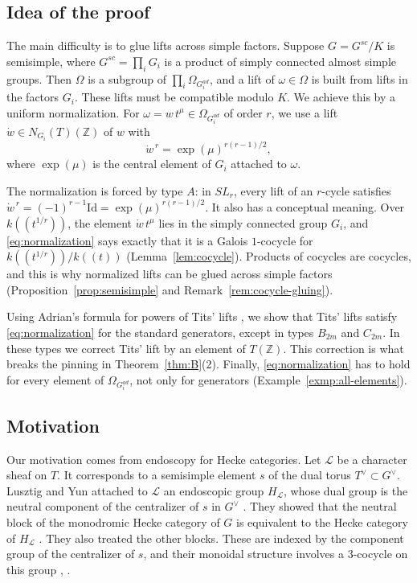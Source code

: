 \documentclass[psamsfonts]{amsart}
\theoremstyle{definition}
\theoremstyle{remark}
\numberwithin{equation}{section}
\newcommand{\Z}{\mathbb{Z}}   %
\newcommand{\wdo}{\dot{w}}
\newcommand\cL{\mathcal{L}}
\numberwithin{equation}{section}
\newcommand{\lr}[1]{(\!(#1)\!)}
\newcommand{\om}{\omega}
\newcommand{\Om}{\Omega}
\newcommand{\Id}{\mathrm{Id}}
\theoremstyle{plain}
\begin{document}
\subsection{Idea of the proof}
The main difficulty is to glue lifts across simple factors. Suppose $G=G^{sc}/K$ is semisimple, where $G^{sc}=\prod_iG_i$ is a product of simply connected almost simple groups. Then $\Om$ is a subgroup of $\prod_i\Om_{G_i^{ad}}$, and a lift of $\om\in\Om$ is built from lifts in the factors $G_i$. These lifts must be compatible modulo $K$. We achieve this by a uniform normalization. For $\om=w\,t^{\mu}\in\Om_{G_i^{ad}}$ of order $r$, we use a lift $\wdo\in N_{G_i}(T)(\Z)$ of $w$ with
\begin{equation}\label{eq:normalization}
\wdo^{\,r}=\exp(\mu)^{r(r-1)/2},
\end{equation}
where $\exp(\mu)$ is the central element of $G_i$ attached to $\om$.

The normalization is forced by type $A$: in $SL_r$, every lift of an $r$-cycle satisfies $\wdo^{\,r}=(-1)^{r-1}\Id=\exp(\mu)^{r(r-1)/2}$. It also has a conceptual meaning. Over $k\lr{t^{1/r}}$, the element $\wdo\,t^{\mu}$ lies in the simply connected group $G_i$, and \eqref{eq:normalization} says exactly that it is a Galois $1$-cocycle for $k\lr{t^{1/r}}/k\lr{t}$ (Lemma~\ref{lem:cocycle}). Products of cocycles are cocycles, and this is why normalized lifts can be glued across simple factors (Proposition~\ref{prop:semisimple} and Remark~\ref{rem:cocycle-gluing}).

Using Adrian's formula for powers of Tits' lifts \cite[Corollary~2.4]{Ad}, we show that Tits' lifts satisfy \eqref{eq:normalization} for the standard generators, except in types $B_{2m}$ and $C_{2m}$. In these types we correct Tits' lift by an element of $T(\Z)$. This correction is what breaks the pinning in Theorem~\ref{thm:B}(2). Finally, \eqref{eq:normalization} has to hold for every element of $\Om_{G_i^{ad}}$, not only for generators (Example~\ref{exmp:all-elements}).

\subsection{Motivation}
Our motivation comes from endoscopy for Hecke categories. Let $\cL$ be a character sheaf on $T$. It corresponds to a semisimple element $s$ of the dual torus $T^\vee\subset G^\vee$. Lusztig and Yun attached to $\cL$ an endoscopic group $H_{\cL}$, whose dual group is the neutral component of the centralizer of $s$ in $G^\vee$ \cite[\S1.2 and \S2.4]{LY20}. They showed that the neutral block of the monodromic Hecke category of $G$ is equivalent to the Hecke category of $H_{\cL}$ \cite[Theorem~1.3]{LY20}. They also treated the other blocks. These are indexed by the component group of the centralizer of $s$, and their monoidal structure involves a $3$-cocycle on this group \cite[Theorem~10.12]{LY20}, \cite{LY21}.
\end{document}
